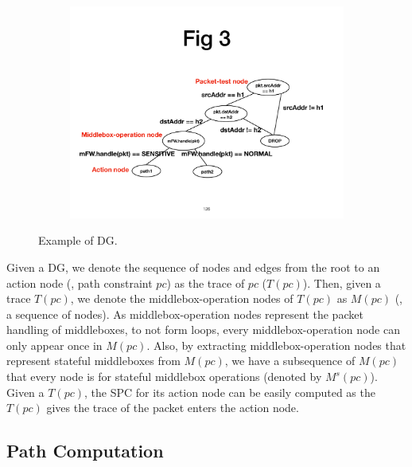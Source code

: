 \begin{figure}[!htbp]
\centering
\begin{subfigure}{0.8\linewidth}
      \centering\includegraphics[width=\linewidth]{figures/ss-126.pdf}
\end{subfigure}
\vspace{-2mm}
\caption{\small Example of DG.}
\label{fig:dg-example}
\end{figure}

Given a DG, we denote the sequence of nodes and edges from the root to an action node (\ie, path constraint $pc$) as the trace of $pc$ ($T(pc)$). Then, given a trace $T(pc)$, we denote the middlebox-operation nodes of $T(pc)$ as $M(pc)$ (\ie, a sequence of nodes). As middlebox-operation nodes represent the packet handling of middleboxes, to not form loops, every middlebox-operation node can only appear once in $M(pc)$. Also, by extracting middlebox-operation nodes that represent stateful middleboxes from $M(pc)$, we have a subsequence of $M(pc)$ that every node is for stateful middlebox operations (denoted by $M^s(pc)$). Given a $T(pc)$, the SPC for its action node can be easily computed as the $T(pc)$ gives the trace of the packet enters the action node.

\vspace{-2mm}
\subsection{Path Computation}

